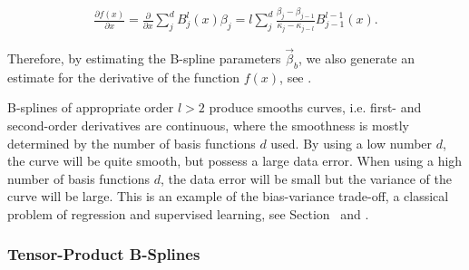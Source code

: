 \begin{align} \label{eq:Bspline-derivative}
	\frac{\partial{f(x)}}{\partial x}= \frac{\partial}{\partial x} \sum_{j}^d B_j^l(x) \beta_j = l \sum_{j}^d \frac{\beta_j - \beta_{j-1}}{\kappa_j - \kappa_{j-l}} B_{j-1}^{l-1}(x).
\end{align}
%

Therefore, by estimating the B-spline parameters $\vec{\beta}_b$, we also generate an estimate for the derivative of the function $f(x)$, see \cite{fahrmeir2007regression}.

B-splines of appropriate order $l > 2$ produce smooths curves, i.e. first- and second-order derivatives are continuous, where the smoothness is mostly determined by the number of basis functions $d$ used. By using a low number $d$, the curve will be quite smooth, but possess a large data error. When using a high number of basis functions $d$, the data error will be small but the variance of the curve will be large. This is an example of the bias-variance trade-off, a classical problem of regression and supervised learning, see Section~ and \cite{deBoor1978practicalGuideToSplines}.  


\subsubsection{Tensor-Product B-Splines} \label{subsubsec:tp-splines}

